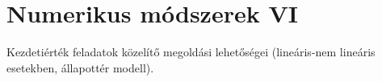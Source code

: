 \documentclass[../../main.tex]{subfiles}
\begin{document}
\section{Numerikus módszerek VI}

\begin{fulltheorem}
	Kezdetiérték feladatok közelítő megoldási lehetőségei
	(lineáris-nem lineáris esetekben, állapottér modell).
\end{fulltheorem}
\end{document}
